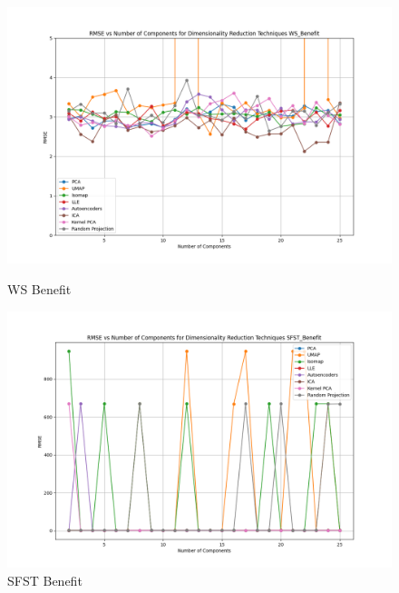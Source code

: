 \begin{figure}[H]
    \centering
    \begin{minipage}{0.45\textwidth}
        \centering
        \includegraphics[width=\linewidth]{reg_section_all/images_dimred_results/dimensionality_reduction_rmse_plot_WS_Benefit_best.png}
        \caption{WS Benefit}
        \label{fig:ws_ben_reg_dimred_training}
    \end{minipage}\hfill
    \begin{minipage}{0.45\textwidth}
        \centering
        \includegraphics[width=\linewidth]{reg_section_all/images_dimred_results/dimensionality_reduction_rmse_plot_SFST_Benefit_best.png}
        \caption{SFST Benefit}
        \label{fig:sfst_ben_reg_dimred_training}
    \end{minipage}
\end{figure}

